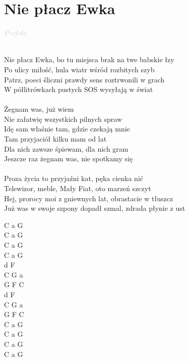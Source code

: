 \documentclass[a5paper, 10pt]{book}
\begin{document}
\section{Nie płacz Ewka}\textcolor{lightgray}{\textit{Perfekt}}\\~\\
\begin{minipage}[t]{0.8\textwidth}
Nie płacz Ewka, bo tu miejsca brak na twe babskie łzy\\
Po ulicy miłość, hula wiatr wśród rozbitych szyb\\
Patrz, poeci śliczni prawdy sens roztrwonili w grach\\
W półlitrówkach pustych SOS wysyłają w świat\\
\\
\hspace*{5mm}Żegnam was, już wiem\\
\hspace*{5mm}Nie załatwię wszystkich pilnych spraw\\
\hspace*{5mm}Idę sam właśnie tam, gdzie czekają mnie\\
\hspace*{5mm}Tam przyjaciół kilku mam od lat\\
\hspace*{5mm}Dla nich zawsze śpiewam, dla nich gram\\
\hspace*{5mm}Jeszcze raz żegnam was, nie spotkamy się\\
\\
Proza życia to przyjaźni kat, pęka cienka nić\\
Telewizor, meble, Mały Fiat, oto marzeń szczyt\\
Hej, prorocy moi z gniewnych lat, obrastacie w tłuszcz\\
Już was w swoje szpony dopadł szmal, zdrada płynie z ust\\
\end{minipage}
\begin{minipage}[t]{0.2\textwidth}
C a G\\
C a G\\
C a G\\
C a G\\

d F \\
C G a\\
G F C\\
d F \\
C G a\\
G F C\\

C a G\\
C a G\\
C a G\\
C a G\\
\end{minipage}
\end{document}
